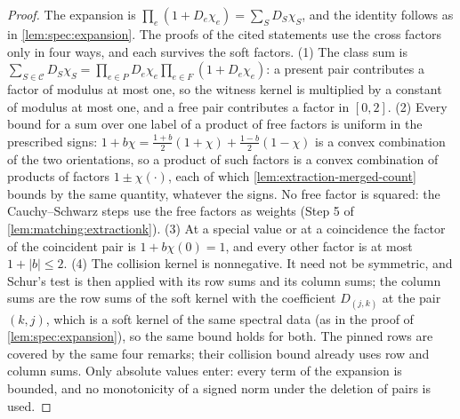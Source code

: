 \begin{proof}
The expansion is $\prod_e(1+D_e\chi_e)=\sum_SD_S\chi_S$, and the identity follows as in
\cref{lem:spec:expansion}. The proofs of the cited statements use the cross factors
only in four ways, and each survives the soft factors. (1) The class sum is
$\sum_{S\in\mathcal C}D_S\chi_S=\prod_{e\in P}D_e\chi_e\prod_{e\in F}(1+D_e\chi_e)$: a
present pair contributes a factor of modulus at most one, so the witness kernel is
multiplied by a constant of modulus at most one, and a free pair contributes a factor
in $[0,2]$. (2) Every bound for a sum over one label of a product of free factors is
uniform in the prescribed signs: $1+b\chi=\frac{1+b}2(1+\chi)+\frac{1-b}2(1-\chi)$ is a
convex combination of the two orientations, so a product of such factors is a convex
combination of products of factors $1\pm\chi(\cdot)$, each of which
\cref{lem:extraction-merged-count} bounds by the same quantity, whatever the signs. No
free factor is squared: the Cauchy--Schwarz steps use the free factors as weights (Step
5 of \cref{lem:matching:extractionk}). (3) At a special value or at a coincidence the
factor of the coincident pair is $1+b\chi(0)=1$, and every other factor is at most
$1+|b|\le2$. (4) The collision kernel is nonnegative. It need not be symmetric, and
Schur's test is then applied with its row sums and its column sums; the column sums are
the row sums of the soft kernel with the coefficient $D_{(j,k)}$ at the pair $(k,j)$,
which is a soft kernel of the same spectral data (as in the proof of
\cref{lem:spec:expansion}), so the same bound holds for both. The pinned rows are
covered by the same four remarks; their collision bound already uses row and column
sums. Only absolute values enter: every term of the expansion is bounded, and no
monotonicity of a signed norm under the deletion of pairs is used.
\end{proof}

